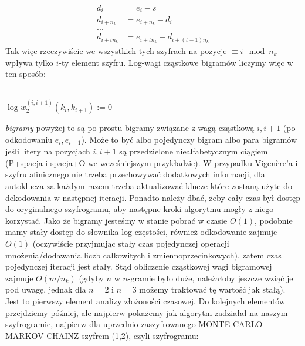 \documentclass[a4paper]{article}
\theoremstyle{defn}
\theoremstyle{theorem}
\theoremstyle{lemma}
\theoremstyle{cor}
\theoremstyle{fact}
\begin{document}
\begin{align*}
    d_i &= e_i - s\\
    d_{i+n_k} &= e_{i+n_k} - d_i\\
    ...\\
    d_{i+tn_k} &= e_{i+tn_k} - d_{i+(t-1)n_k}
\end{align*}
Tak więc rzeczywiście we wszystkich tych szyfrach na pozycje $\equiv i \mod n_k$ wpływa tylko $i$-ty element szyfru. Log-wagi cząstkowe bigramów liczymy więc w ten sposób:\\\\
\begin{algorithm}[H]
$\log w_2^{(i,i+1)}(k_i, k_{i+1}) := 0$\;
\end{algorithm}
\textit{bigramy} powyżej to są po prostu bigramy związane z wagą cząstkową $i,i+1$ (po odkodowaniu $e_i, e_{i+1}$). Może to być albo pojedynczy bigram albo para bigramów jeśli litery na pozycjach $i, i+1$ są przedzielone niealfabetycznym ciągiem (P+spacja i spacja+O we wcześniejszym przykładzie). W przypadku Vigenère'a i szyfru afinicznego nie trzeba przechowywać dodatkowych informacji, dla autoklucza za każdym razem trzeba aktualizować klucze które zostaną użyte do dekodowania w następnej iteracji. Ponadto należy dbać, żeby cały czas był dostęp do oryginalnego szyfrogramu, aby następne kroki algorytmu mogły z niego korzystać. Jako że bigramy jesteśmy w stanie pobrać w czasie $O(1)$, podobnie mamy stały dostęp do słownika log-częstości, również odkodowanie zajmuje $O(1)$ (oczywiście przyjmując stały czas pojedynczej operacji mnożenia/dodawania liczb całkowitych i zmiennoprzecinkowych), zatem czas pojedynczej iteracji jest stały. Stąd obliczenie cząstkowej wagi bigramowej zajmuje $O(m/n_k)$ (gdyby $n$ w $n$-gramie było duże, należałoby jeszcze wziąć je pod uwagę, jednak dla $n=2$ i $n=3$ możemy traktować tę wartość jak stałą). Jest to pierwszy element analizy złożoności czasowej. Do kolejnych elementów przejdziemy później, ale najpierw pokażemy jak algorytm zadziałał na naszym szyfrogramie, najpierw dla uprzednio zaszyfrowanego MONTE CARLO MARKOV CHAINZ szyfrem (1,2), czyli szyfrogramu:
\end{document}

